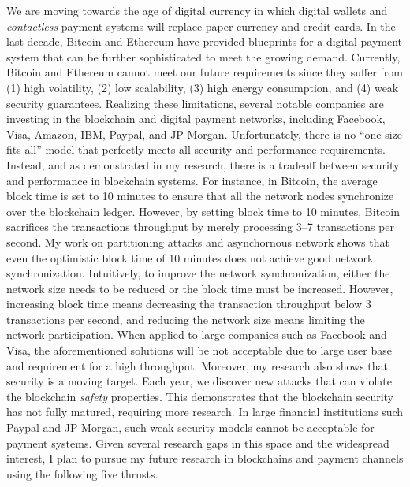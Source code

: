 \documentclass{NSF}
\begin{document}
\vspace{1mm}
We are moving towards the age of digital currency in which digital wallets and {\em contactless} payment systems will replace paper currency and credit cards. In the last decade, Bitcoin and Ethereum have provided blueprints for a digital payment system that can be further sophisticated to meet the growing demand. Currently, Bitcoin and Ethereum cannot meet our future requirements since they suffer from (1) high volatility, (2) low scalability, (3) high energy consumption, and (4) weak security guarantees. Realizing these limitations, several notable companies are investing in the blockchain and digital payment networks, including Facebook, Visa, Amazon, IBM, Paypal, and JP Morgan. Unfortunately, there is no ``one size fits all'' model that perfectly meets all security and performance requirements. Instead, and as demonstrated in my research, there is a tradeoff between security and performance in blockchain systems. For instance, in Bitcoin, the average block time is set to 10 minutes to ensure that all the network nodes synchronize over the blockchain ledger. However, by setting block time to 10 minutes, Bitcoin sacrifices the transactions throughput by merely processing 3--7 transactions per second. My work on partitioning attacks and asynchornous network shows that even the optimistic block time of 10 minutes does not achieve good network synchronization. Intuitively, to improve the network synchronization, either the network size needs to be reduced or the block time must be increased. However, increasing block time means decreasing the transaction throughput below 3 transactions per second, and reducing the network size means limiting the network participation. When applied to large companies such as Facebook and Visa, the aforementioned solutions will be not acceptable due to large user base and requirement for a high throughput. Moreover, my research also shows that security is a moving target. Each year, we discover new attacks that can violate the blockchain {\em safety} properties. This demonstrates that the blockchain security has not fully matured, requiring more research. In large financial institutions such Paypal and JP Morgan, such weak security models cannot be acceptable for payment systems. Given several research gaps in this space and the widespread interest, I plan to pursue my future research in blockchains and payment channels using the following five thrusts. 

\vspace{2mm}
\end{document}
